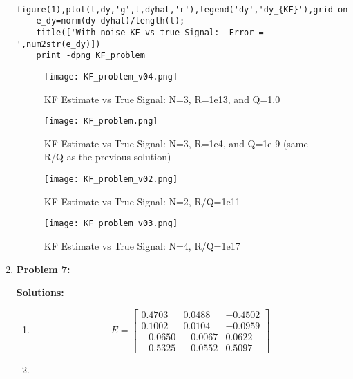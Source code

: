 \documentclass[letterpaper]{article}
\begin{document}
\begin{enumerate}
\begin{verbatim}
    figure(1),plot(t,dy,'g',t,dyhat,'r'),legend('dy','dy_{KF}'),grid on
    e_dy=norm(dy-dyhat)/length(t);
    title(['With noise KF vs true Signal:  Error = ',num2str(e_dy)])
    print -dpng KF_problem
\end{verbatim}

\begin{figure}[h]
\centering
\texttt{[image: KF\_problem\_v04.png]}
\setlength{\abovecaptionskip}{0pt}
\caption{KF Estimate vs True Signal: N=3, R=1e13, and Q=1.0}
\label{fig:Prob6}
\end{figure}

\begin{figure}[h]
\centering
\texttt{[image: KF\_problem.png]}
\setlength{\abovecaptionskip}{0pt}
\caption{KF Estimate vs True Signal: N=3, R=1e4, and Q=1e-9 (same R/Q as the previous solution)}
\label{fig:Prob6}
\end{figure}

\begin{figure}[h]
\centering
\texttt{[image: KF\_problem\_v02.png]}
\setlength{\abovecaptionskip}{0pt}
\caption{KF Estimate vs True Signal: N=2, R/Q=1e11}
\label{fig:Prob6}
\end{figure}

\begin{figure}[h]
\centering
\texttt{[image: KF\_problem\_v03.png]}
\setlength{\abovecaptionskip}{0pt}
\caption{KF Estimate vs True Signal: N=4, R/Q=1e17}
\label{fig:Prob6}
\end{figure}

\clearpage

\newpage

\item \noindent \textbf{Problem 7:}

\textbf{Solutions:}
\begin{enumerate}
\setlength{\itemsep}{.1in}
\renewcommand{\labelenumi}{(\alph{enumi})}

\item

$$E=\left[ \begin{array}{rrr}0.4703& 0.0488& -0.4502\\0.1002& 0.0104& -0.0959\\-0.0650& -0.0067& 0.0622\\-0.5325& -0.0552& 0.5097\end{array} \right]
$$

\item


\end{enumerate}
\end{enumerate}
\end{document}
